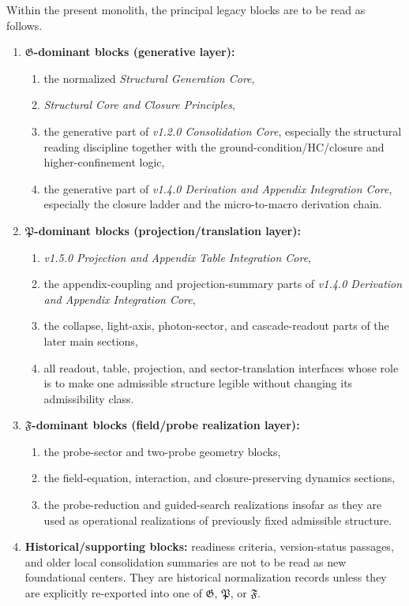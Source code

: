 \begin{definition}
\label{def:layer-assignment-legacy-core-blocks}
Within the present monolith, the principal legacy blocks are to be read as
follows.
\begin{enumerate}[leftmargin=2em,label=(L\arabic*)]
\item \textbf{$\mathfrak G$-dominant blocks (generative layer):}
\begin{enumerate}[leftmargin=2.5em,label=(\alph*)]
\item the normalized \emph{Structural Generation Core},
\item \emph{Structural Core and Closure Principles},
\item the generative part of \emph{v1.2.0 Consolidation Core}, especially the
structural reading discipline together with the ground-condition/HC/closure and
higher-confinement logic,
\item the generative part of \emph{v1.4.0 Derivation and Appendix Integration Core},
especially the closure ladder and the micro-to-macro derivation chain.
\end{enumerate}
\item \textbf{$\mathfrak P$-dominant blocks (projection/translation layer):}
\begin{enumerate}[leftmargin=2.5em,label=(\alph*)]
\item \emph{v1.5.0 Projection and Appendix Table Integration Core},
\item the appendix-coupling and projection-summary parts of \emph{v1.4.0 Derivation and Appendix Integration Core},
\item the collapse, light-axis, photon-sector, and cascade-readout parts of the later main sections,
\item all readout, table, projection, and sector-translation interfaces whose
role is to make one admissible structure legible without changing its
admissibility class.
\end{enumerate}
\item \textbf{$\mathfrak F$-dominant blocks (field/probe realization layer):}
\begin{enumerate}[leftmargin=2.5em,label=(\alph*)]
\item the probe-sector and two-probe geometry blocks,
\item the field-equation, interaction, and closure-preserving dynamics sections,
\item the probe-reduction and guided-search realizations insofar as they are
used as operational realizations of previously fixed admissible structure.
\end{enumerate}
\item \textbf{Historical/supporting blocks:} readiness criteria, version-status
passages, and older local consolidation summaries are not to be read as new
foundational centers. They are historical normalization records unless they are
explicitly re-exported into one of $\mathfrak G$, $\mathfrak P$, or
$\mathfrak F$.
\end{enumerate}
\end{definition}

